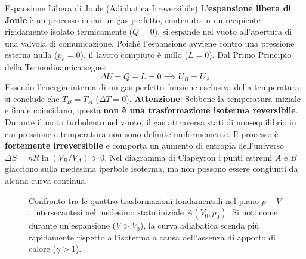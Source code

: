 \begin{definizione}{Espansione Libera di Joule (Adiabatica Irreversibile)}
L'\textbf{espansione libera di Joule} è un processo in cui un gas perfetto, contenuto in un recipiente rigidamente isolato termicamente ($Q = 0$), si espande nel vuoto all'apertura di una valvola di comunicazione. Poiché l'espansione avviene contro una pressione esterna nulla ($p_e = 0$), il lavoro compiuto è nullo ($L = 0$). Dal Primo Principio della Termodinamica segue:
\begin{equation}
    \Delta U = Q - L = 0 \implies U_B = U_A
\end{equation}
Essendo l'energia interna di un gas perfetto funzione esclusiva della temperatura, si conclude che $T_B = T_A$ ($\Delta T = 0$). 
\textbf{Attenzione}: Sebbene la temperatura iniziale e finale coincidano, questa \textbf{non è una trasformazione isoterma reversibile}. Durante il moto turbolento nel vuoto, il gas attraversa stati di non-equilibrio in cui pressione e temperatura non sono definite uniformemente. Il processo è \textbf{fortemente irreversibile} e comporta un aumento di entropia dell'universo $\Delta S = n R \ln(V_B / V_A) > 0$. Nel diagramma di Clapeyron i punti estremi $A$ e $B$ giacciono sulla medesima iperbole isoterma, ma non possono essere congiunti da alcuna curva continua.
\end{definizione}

\begin{figure}[ht]
\centering
{}
\caption{Confronto tra le quattro trasformazioni fondamentali nel piano $p-V$, intersecantesi nel medesimo stato iniziale $A(V_0, p_0)$. Si noti come, durante un'espansione ($V > V_0$), la curva adiabatica scenda più rapidamente rispetto all'isoterma a causa dell'assenza di apporto di calore ($\gamma > 1$).}
\end{figure}
